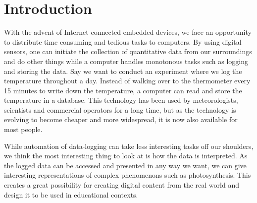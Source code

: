 \setcounter{page}{1}
\chapter{Introduction}


With the advent of Internet-connected embedded devices, we face an opportunity to distribute time consuming and tedious tasks to computers. By using digital sensors, one can initiate the collection of quantitative data from our surroundings and do other things while a computer handles monotonous tasks such as logging and storing the data. Say we want to conduct an experiment where we log the temperature throughout a day. Instead of walking over to the thermometer every 15 minutes to write down the temperature, a computer can read and store the temperature in a database. This technology has been used by meteorologists, scientists and commercial operators for a long time, but as the technology is evolving to become cheaper and more widespread, it is now also available for most people. %

While automation of data-logging can take less interesting tasks off our shoulders, we think the most interesting thing to look at is how the data is interpreted. As the logged data can be accessed and presented in any way we want, we can give interesting representations of complex phenomenons such as photosynthesis. This creates a great possibility for creating digital content from the real world and design it to be used in educational contexts. 

